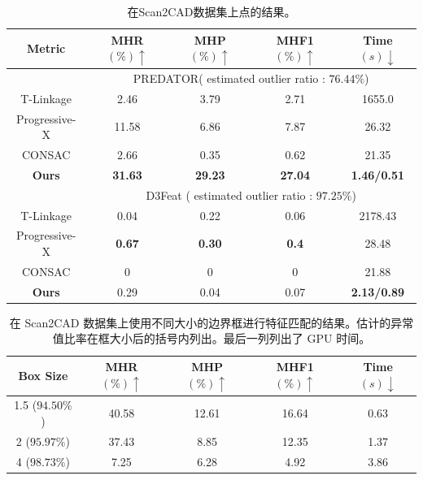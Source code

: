     
    
\begin{table}[h]
  \scriptsize 
  \centering
    \begin{tabular}{ccccc} %
    \toprule
    \textbf{Metric}& MHR$\left( \% \right) \uparrow $& MHP$\left( \% \right) \uparrow $& MHF1$\left( \% \right) \uparrow $ & Time$\left( s \right) \downarrow $ \\
    \hline
    & \multicolumn{4}{c}{PREDATOR( estimated outlier ratio : $76.44\%$)} \\
    \hline
    T-Linkage & 2.46 & 3.79 & 2.71 & 1655.0 \\
    Progressive-X & 11.58 & 6.86 & 7.87 & 26.32\\
    CONSAC & 2.66 & 0.35 & 0.62 & 21.35\\
    \textbf{Ours} & \textbf{31.63} & \textbf{29.23} & \textbf{27.04} & \textbf{1.46/0.51} \\
    \hline
                    
    &\multicolumn{4}{c}{ D3Feat ( estimated outlier ratio :  $97.25\%$)} \\
    \hline
    T-Linkage & 0.04 & 0.22 & 0.06 & 2178.43 \\
    Progressive-X & \textbf{0.67} & \textbf{0.30} & \textbf{0.4} & 28.48 \\
    CONSAC & 0 & 0 & 0 & 21.88 \\
    \textbf{Ours} & 0.29 & 0.04 & 0.07 & \textbf{2.13/0.89} \\
  \bottomrule
  \end{tabular}
    \caption{在Scan2CAD数据集上点的结果。}
    \label{tab:Scan2CAD-cad}
\end{table}

\begin{table}[ht]
    \centering
\scriptsize
    \begin{tabular}{ccccc}
      \toprule
        Box Size& MHR$\left( \% \right) \uparrow $ & MHP $\left( \% \right) \uparrow $ & MHF1$\left( \% \right) \uparrow $& Time$\left( s \right) \downarrow $ \\
        \midrule  
        1.5 ($94.50\%$) & 40.58 & 12.61 & 16.64 & 0.63  \\
        2 ($95.97\%$) & 37.43 & 8.85 & 12.35 & 1.37  \\
        4 ($98.73\%$)& 7.25 & 6.28 & 4.92 & 3.86  \\
        \bottomrule
    \end{tabular}
    \caption{在 Scan2CAD 数据集上使用不同大小的边界框进行特征匹配的结果。估计的异常值比率在框大小后的括号内列出。最后一列列出了 GPU 时间。
    }
    \label{tab:biggerbox}
\end{table}



